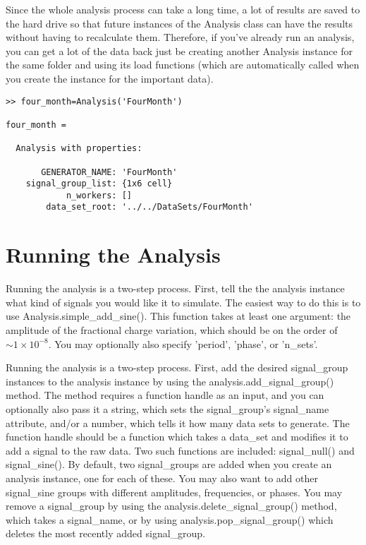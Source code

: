 \documentclass[12pt]{report}
\begin{document}
Since the whole analysis process can take a long time, a lot of results are saved to the hard drive so that future instances of the Analysis class can have the results without having to recalculate them.  Therefore, if you've already run an analysis, you can get a lot of the data back just be creating another Analysis instance for the same folder and using its load functions (which are automatically called when you create the instance for the important data).

\begin{verbatim}
>> four_month=Analysis('FourMonth')

four_month = 

  Analysis with properties:

       GENERATOR_NAME: 'FourMonth'
    signal_group_list: {1x6 cell}
            n_workers: []
        data_set_root: '../../DataSets/FourMonth'

\end{verbatim}

\section{Running the Analysis}
Running the analysis is a two-step process.  First, tell the the analysis instance what kind of signals you would like it to simulate.  The easiest way to do this is to use Analysis.simple\_add\_sine().  This function takes at least one argument: the amplitude of the fractional charge variation, which should be on the order of ~$\sim 1 \times 10^{-8}$.  You may optionally also specify 'period', 'phase', or 'n\_sets'.

Running the analysis is a two-step process.  First, add the desired signal\_group instances to the analysis instance by using the analysis.add\_signal\_group() method.  The method requires a function handle as an input, and you can optionally also pass it a string, which sets the signal\_group's signal\_name attribute, and/or a number, which tells it how many data sets to generate.  The function handle should be a function which takes a data\_set and modifies it to add a signal to the raw data.  Two such functions are included: signal\_null() and signal\_sine().  By default, two signal\_groups are added when you create an analysis instance, one for each of these.  You may also want to add other signal\_sine groups with different amplitudes, frequencies, or phases.  You may remove a signal\_group by using the analysis.delete\_signal\_group() method, which takes a signal\_name, or by using analysis.pop\_signal\_group() which deletes the most recently added signal\_group.
\end{document}
